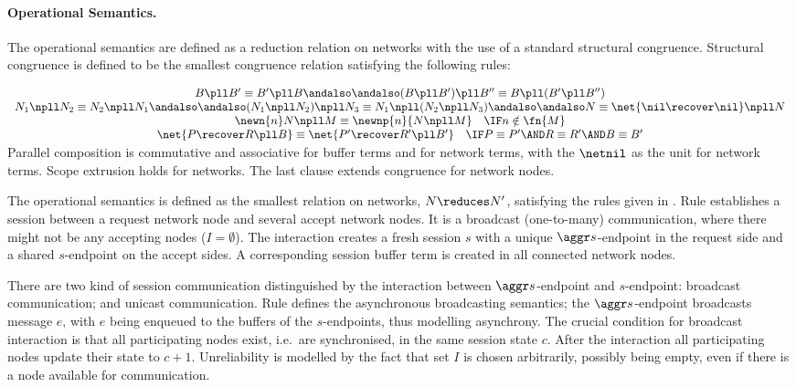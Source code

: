 \paragraph{Operational Semantics.}
\label{subsec:os}
%
The operational semantics are defined as a reduction relation
on networks with the use of a standard structural congruence.
%
	Structural congruence
	is defined to be the smallest congruence relation satisfying the following rules:

	$
	\begin{array}{c}
		B \pll B' \equiv B' \pll B
		\andalso \andalso
		(B \pll B') \pll B'' \equiv B \pll (B' \pll B'')
		\\
		N_1 \npll N_2 \equiv N_2 \npll N_1
		\andalso \andalso
		(N_1 \npll N_2) \npll N_3 \equiv N_1 \npll (N_2 \npll N_3)
		\andalso \andalso
		N \equiv \net{\nil \recover \nil} \npll N
		\\
		\newn{n} N \npll M \equiv \newnp{n}{N \npll M} \quad \IF n \notin \fn{M}
		\\
		\net{P \recover R \pll B} \equiv \net{P' \recover R' \pll B'} \quad \IF P \equiv P' \AND R \equiv R' \AND B \equiv B'
	\end{array}
	$
%
Parallel composition is commutative and associative for buffer terms
and for network terms, with the $\netnil$ as the unit
for network terms.
Scope extrusion holds for networks.
The last clause extends congruence for network nodes.



The operational semantics is defined as the smallest relation on networks,
$N \reduces N'$, satisfying the rules given in .
%
Rule \Connect establishes a session between a request network node and
several accept network nodes. It is a broadcast (one-to-many) communication,
where there might not be any accepting nodes ($I = \emptyset$).
%
The interaction creates a fresh session $s$ with a unique $\aggr s$-endpoint
in the request side and a shared $s$-endpoint on the accept sides.
A corresponding session buffer term is created in all connected network nodes.

There are two kind of session communication distinguished
by the interaction between $\aggr s$-endpoint and $s$-endpoint:
broadcast communication; and unicast communication.
%
Rule \Broadcast defines the asynchronous broadcasting semantics;
the $\aggr s$-endpoint broadcasts message $e$, with $e$
being enqueued to the buffers of the $s$-endpoints,
thus modelling asynchrony.
%
The crucial condition for broadcast interaction is that
all participating nodes exist, i.e.~are synchronised,
in the same session state $c$. After the interaction all
participating nodes update their state to $c+1$.
%
Unreliability is modelled by the fact that set $I$ is chosen
arbitrarily, possibly being empty, even if there is a
node available for communication.

